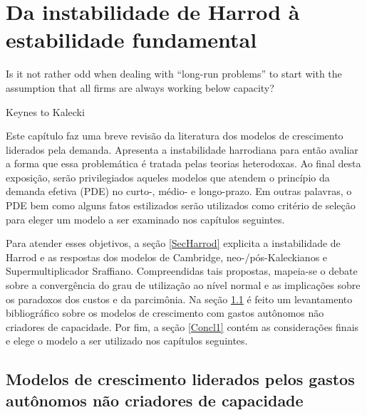 \chapter{Da instabilidade de Harrod à estabilidade fundamental}

\epigraph{Is it not rather odd when dealing with ``long-run problems'' to start with the assumption that all firms are always working below capacity?}{Keynes to Kalecki}


Este capítulo faz uma breve revisão da literatura dos modelos de crescimento liderados pela demanda. Apresenta a instabilidade harrodiana para então avaliar a forma que essa problemática é tratada pelas teorias heterodoxas.
Ao final desta exposição, serão privilegiados aqueles modelos que atendem o princípio da demanda efetiva (PDE) no curto-, médio- e longo-prazo. Em outras palavras, o PDE bem como alguns fatos estilizados serão utilizados como critério de seleção para eleger um modelo a ser examinado nos capítulos seguintes.


Para atender esses objetivos, a seção \ref{SecHarrod} explicita a instabilidade de Harrod e as respostas dos modelos de Cambridge, neo-/pós-Kaleckianos e Supermultiplicador Sraffiano. Compreendidas tais propostas, mapeia-se o debate sobre a convergência do grau de utilização ao nível normal e as implicações sobre os paradoxos dos custos e da parcimônia. Na seção \ref{Literatura} é feito um levantamento bibliográfico sobre os modelos de crescimento com gastos autônomos não criadores de capacidade. Por fim, a seção \ref{Concl1} contém as considerações finais e elege o modelo a ser utilizado nos capítulos seguintes.



\section{Modelos de crescimento liderados pelos gastos autônomos não criadores de capacidade}\label{Literatura}





%

